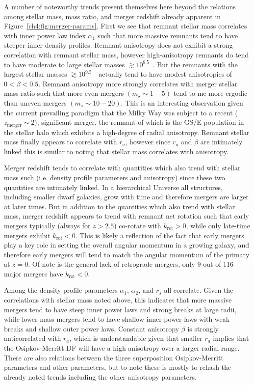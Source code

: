 A number of noteworthy trends present themselves here beyond the relations among stellar mass, mass ratio, and merger redshift already apparent in Figure~\ref{ch4:fig:merger-params}. First we see that remnant stellar mass correlates with inner power law index $\alpha_{1}$ such that more massive remnants tend to have steeper inner density profiles. Remnant anisotropy does not exhibit a strong correlation with remnant stellar mass, however high-anisotropy remnants do tend to have moderate to large stellar masses $\gtrsim 10^{8.5}$~\Msun. But the remnants with the largest stellar masses $\gtrsim 10^{9.5}$~\Msun\ actually tend to have modest anisotropies of $0 < \beta < 0.5$. Remnant anisotropy more strongly correlates with merger stellar mass ratio such that more even mergers $(m_{\star} \sim 1-5)$ tend to me more ergodic than uneven mergers $(m_{\star} \sim 10-20)$. This is an interesting observation given the current prevailing paradigm that the Milky Way was subject to a recent ($z_\mathrm{merger} \sim 2)$, significant merger, the remnant of which is the GS/E population in the stellar halo which exhibits a high-degree of radial anisotropy. Remnant stellar mass finally appears to correlate with $r_{a}$, however since $r_{a}$ and $\beta$ are intimately linked this is similar to noting that stellar mass correlates with anisotropy.

Merger redshift tends to correlate with quantities which also trend with stellar mass such (i.e. density profile parameters and anisotropy) since these two quantities are intimately linked. In a hierarchical Universe all structures, including smaller dwarf galaxies, grow with time and therefore mergers are larger at later times. But in addition to the quantities which also trend with stellar mass, merger redshift appears to trend with remnant net rotation such that early mergers typically (always for $z>2.5$) co-rotate with $k_\mathrm{rot} > 0$, while only late-time mergers exhibit $k_\mathrm{rot} < 0$. This is likely a reflection of the fact that early mergers play a key role in setting the overall angular momentum in a growing galaxy, and therefore early mergers will tend to match the angular momentum of the primary at $z=0$. Of note is the general lack of retrograde mergers, only 9 out of 116 major mergers have $k_\mathrm{rot} < 0$.

Among the density profile parameters $\alpha_{1}$, $\alpha_{2}$, and $r_{s}$ all correlate. Given the correlations with stellar mass noted above, this indicates that more massive mergers tend to have steep inner power laws and strong breaks at large radii, while lower mass mergers tend to have shallow inner power laws with weak breaks and shallow outer power laws. Constant anisotropy $\beta$ is strongly anticorrelated with $r_{a}$, which is understandable given that smaller $r_{a}$ implies that the Osipkov-Merritt DF will have a high anisotropy over a larger radial range. There are also relations between the three superposition Osipkov-Merritt parameters and other parameters, but to note these is mostly to rehash the already noted trends including the other anisotropy parameters.


